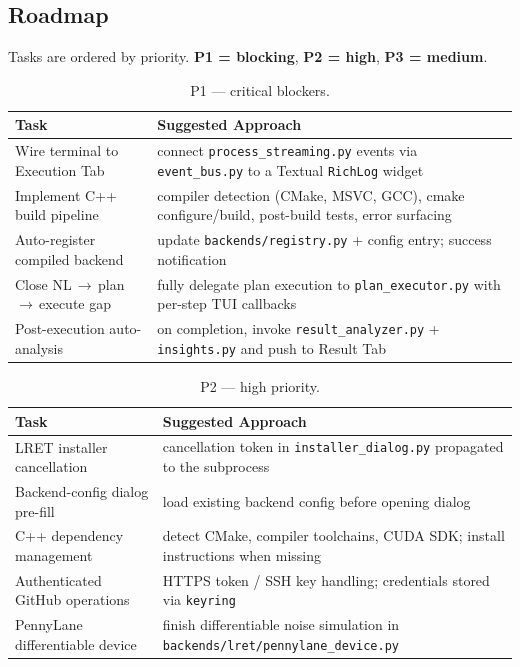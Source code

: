 \documentclass[11pt,a4paper]{article}
\begin{document}
\subsection{Roadmap}
\label{sec:proxima-roadmap}

Tasks are ordered by priority. \textcolor{p1color}{\textbf{P1 = blocking}},
\textcolor{p2color}{\textbf{P2 = high}}, \textcolor{p3color}{\textbf{P3 = medium}}.

\begin{table}[!h]
\centering
\footnotesize
\renewcommand{\arraystretch}{1.2}
\caption{\textcolor{p1color}{P1 --- critical blockers.}}
\begin{tabular}{@{}p{3.8cm}p{10.8cm}@{}}
\toprule
\textbf{Task} & \textbf{Suggested Approach} \\
\midrule
Wire terminal to Execution Tab           & connect \texttt{process\_streaming.py} events via \texttt{event\_bus.py} to a Textual \texttt{RichLog} widget \\
Implement C++ build pipeline             & compiler detection (CMake, MSVC, GCC), cmake configure/build, post-build tests, error surfacing \\
Auto-register compiled backend           & update \texttt{backends/registry.py} + config entry; success notification \\
Close NL\,$\to$\,plan\,$\to$\,execute gap & fully delegate plan execution to \texttt{plan\_executor.py} with per-step TUI callbacks \\
Post-execution auto-analysis              & on completion, invoke \texttt{result\_analyzer.py} + \texttt{insights.py} and push to Result Tab \\
\bottomrule
\end{tabular}
\end{table}

\begin{table}[!h]
\centering
\footnotesize
\renewcommand{\arraystretch}{1.2}
\caption{\textcolor{p2color}{P2 --- high priority.}}
\begin{tabular}{@{}p{3.8cm}p{10.8cm}@{}}
\toprule
\textbf{Task} & \textbf{Suggested Approach} \\
\midrule
LRET installer cancellation      & cancellation token in \texttt{installer\_dialog.py} propagated to the subprocess \\
Backend-config dialog pre-fill   & load existing backend config before opening dialog \\
C++ dependency management        & detect CMake, compiler toolchains, CUDA SDK; install instructions when missing \\
Authenticated GitHub operations  & HTTPS token / SSH key handling; credentials stored via \texttt{keyring} \\
PennyLane differentiable device  & finish differentiable noise simulation in \texttt{backends/lret/pennylane\_device.py} \\
\bottomrule
\end{tabular}
\end{table}
\end{document}

